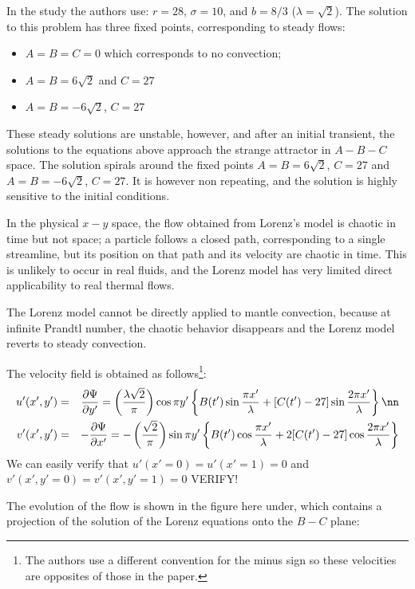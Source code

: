 In the study the authors use: $r=28$, $\sigma=10$, and $b=8/3$ ($\lambda=\sqrt 2$).
The solution to this problem has three fixed points, corresponding to
steady flows:

\begin{itemize}
\item $A=B=C=0$ which corresponds to no convection;
\item $A=B=6\sqrt 2$ and $C=27$
\item $A=B=-6\sqrt 2$, $C=27$
\end{itemize}
These steady solutions are unstable, however, and after an initial transient, the solutions 
to the equations above approach the strange attractor in $A-B-C$ space.
The solution spirals around the fixed points $A=B=6\sqrt 2$, $C=27$ and 
$A=B=-6\sqrt 2$, $C=27$. It is however non repeating, and the solution is highly sensitive to the initial 
conditions. 

In the physical $x-y$ space, the flow obtained from Lorenz's
model is chaotic in time but not space; a particle follows
a closed path, corresponding to a single streamline, but
its position on that path and its velocity are chaotic in time.
This is unlikely to occur in real fluids, and the Lorenz model 
has very limited direct applicability to real thermal flows.

The Lorenz model cannot be directly applied to mantle convection, 
because at infinite Prandtl number, the chaotic behavior disappears and the Lorenz 
model reverts to steady convection.




The velocity field is obtained as follows\footnote{The authors use a different 
convention for the minus sign so these velocities are opposites of those in the paper.}:
\begin{eqnarray}
u'(x',y') 
&=& \frac{\partial \Psi}{\partial y'} 
= \left(
\frac{\lambda \sqrt 2}{\pi}
\right)
\cos \pi y'
\left\{
B(t') \sin \frac{\pi x'}{\lambda}
+[C(t')-27]\sin \frac{2 \pi x'}{\lambda}
\right\} \nn\\
v'(x',y') 
&=& -\frac{\partial \Psi}{\partial x'} 
=-
\left(
\frac{ \sqrt 2}{\pi}
\right)
\sin \pi y'
\left\{
B(t') \cos \frac{\pi x'}{\lambda}
+2[C(t')-27]\cos \frac{2 \pi x'}{\lambda}
\right\}
\end{eqnarray}
We can easily verify that $u'(x'=0)=u'(x'=1)=0$ and
$v'(x',y'=0)=v'(x',y'=1)=0$  VERIFY!



The evolution of the flow is shown in the figure here under, 
which contains a projection of the solution of the Lorenz equations 
onto the $B-C$ plane:

